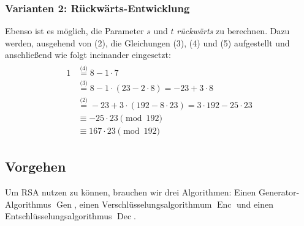 \begin{beispiel}[EEA]
    \subsubsection*{Varianten 2: Rückwärts-Entwicklung}
    Ebenso ist es möglich, die Parameter $s$ und $t$ \emph{rückwärts} zu berechnen. Dazu werden, ausgehend von (2), 
    die Gleichungen (3), (4) und (5) aufgestellt und anschließend wie folgt ineinander eingesetzt:  
    \begin{align*}
      \begin{split}
        1	&\stackrel{\textit{(4)}}{=} 8 - 1 \cdot 7\\
        &\stackrel{\textit{(3)}}{=} 8 - 1 \cdot (23 - 2 \cdot 8) = -23 + 3 \cdot 8\\
        &\stackrel{\textit{(2)}}{=} -23 + 3 \cdot (192 - 8 \cdot 23) = 3 \cdot 192 - 25 \cdot 23\\[.5cm]
        &\equiv -25 \cdot 23 \pmod{192}\\
        &\equiv 167 \cdot 23 \pmod{192}
      \end{split}
    \end{align*}
  \end{beispiel}
  

\subsection{Vorgehen}
\label{ch:asymmenc:rsa:vorgehen}
Um RSA nutzen zu können, brauchen wir drei Algorithmen: Einen
Generator-Algorithmus $\operatorname{Gen}$, einen
Verschlüsselungsalgorithmum $\operatorname{Enc}$ und einen
Entschlüsselungsalgorithmus $\operatorname{Dec}$.
